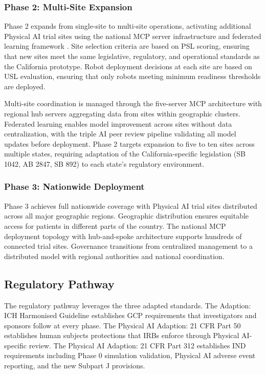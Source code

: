 \subsubsection{Phase 2: Multi-Site Expansion}

Phase 2 expands from single-site to multi-site operations, activating
additional Physical AI trial sites using the national MCP server infrastructure
\cite{national-mcp-paper} and federated learning framework \cite{fl-paper}.
Site selection criteria are based on PSL scoring, ensuring that new sites meet
the same legislative, regulatory, and operational standards as the California
prototype. Robot deployment decisions at each site are based on USL evaluation,
ensuring that only robots meeting minimum readiness thresholds are deployed.

Multi-site coordination is managed through the five-server MCP architecture
with regional hub servers aggregating data from sites within geographic
clusters. Federated learning enables model improvement across sites without
data centralization, with the triple AI peer review pipeline validating all
model updates before deployment. Phase 2 targets expansion to five to ten sites
across multiple states, requiring adaptation of the California-specific
legislation (SB 1042, AB 2847, SB 892) to each state's regulatory environment.

\subsubsection{Phase 3: Nationwide Deployment}

Phase 3 achieves full nationwide coverage with Physical AI trial sites
distributed across all major geographic regions. Geographic distribution
ensures equitable access for patients in different parts of the country. The
national MCP deployment topology with hub-and-spoke architecture supports
hundreds of connected trial sites. Governance transitions from centralized
management to a distributed model with regional authorities and national
coordination.

\subsection{Regulatory Pathway}
\label{subsec:impl-regulatory}

The regulatory pathway leverages the three adapted standards. The Adaption: ICH
Harmonised Guideline \cite{ich-adapt} establishes GCP requirements that
investigators and sponsors follow at every phase. The Physical AI Adaption:
21 CFR Part 50 \cite{cfr50-adapt} establishes human subjects protections that
IRBs enforce through Physical AI-specific review. The Physical AI Adaption:
21 CFR Part 312 \cite{cfr312-adapt} establishes IND requirements including
Phase 0 simulation validation, Physical AI adverse event reporting, and the
new Subpart J provisions.

